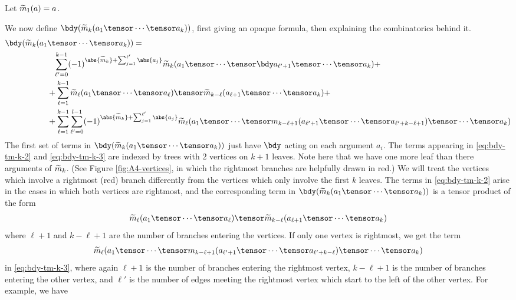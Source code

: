 \documentclass[11pt,leqno]{amsart}
\begin{document}
Let $\widetilde{m}_1(a) = a$.

We now define $\bdy(\tm_k(a_1 \tensor \cdots \tensor a_k))$, first giving an opaque formula, then explaining the combinatorics behind it.
\begin{align}
\notag \bdy(\tm_k(a_1 & \tensor \cdots \tensor a_k)) = \\
\label{eq:bdy-tm-k-1}   & \phantom{+} \sum_{\ell'=0}^{k-1} (-1)^{\abs{\tm_k}+\sum_{j=1}^{\ell'} \abs{a_j}} \tm_k(a_1 \tensor \cdots \tensor \bdy a_{\ell'+1} \tensor \cdots \tensor a_k) + \\
\label{eq:bdy-tm-k-2}   &          +  \sum_{\ell=1}^{k-1} \tm_{\ell}(a_1 \tensor \cdots \tensor a_{\ell}) \tensor \tm_{k-\ell}(a_{\ell+1} \tensor \cdots \tensor a_k) + \\
\label{eq:bdy-tm-k-3}   &          +  \sum_{\ell=1}^{k-1} \sum_{\ell'=0}^{l-1} (-1)^{\abs{\tm_k}+\sum_{j=1}^{\ell'} \abs{a_j}} \tm_{\ell}(a_1 \tensor \cdots \tensor m_{k-\ell + 1}(a_{\ell' + 1} \tensor \cdots \tensor a_{\ell' + k - \ell + 1}) \tensor \cdots \tensor a_k)
\end{align}
The first set of terms in $\bdy(\tm_k(a_1 \tensor \cdots \tensor a_k))$ just have $\bdy$ acting on each argument $a_i$.
The terms appearing in \eqref{eq:bdy-tm-k-2} and \eqref{eq:bdy-tm-k-3} are indexed by trees with $2$ vertices on $k+1$ leaves.
Note here that we have one more leaf than there arguments of $\widetilde{m}_k$.
(See Figure \ref{fig:A4-vertices}, in which the rightmost branches are helpfully drawn in red.)
We will treat the vertices which involve a rightmost (red) branch differently from the vertices which only involve the first $k$ leaves.
The terms in \eqref{eq:bdy-tm-k-2} arise in the cases in which both
vertices are rightmost, and the corresponding term in $\bdy(\tm_k(a_1 \tensor \cdots \tensor a_k))$ is a tensor product of the form
$$\tm_{\ell}(a_1 \tensor \cdots \tensor a_{\ell}) \tensor \tm_{k-\ell}(a_{\ell+1} \tensor \cdots \tensor a_k)$$
where $\ell + 1$ and $k - \ell + 1$ are the number of branches entering the vertices.
If only one vertex is rightmost, we get the term $$\tm_{\ell}(a_1 \tensor \cdots \tensor m_{k-\ell+1}(a_{\ell' + 1} \tensor \cdots \tensor a_{\ell' + k - \ell}) \tensor \cdots \tensor a_k)$$
in \eqref{eq:bdy-tm-k-3},
where again $\ell + 1$ is the number of branches entering the rightmost vertex, $k-\ell+1$ is the number of branches entering the other vertex, and $\ell'$ is the number of edges meeting the rightmost vertex which start to the left of the other vertex.
For example, we have
\end{document}
